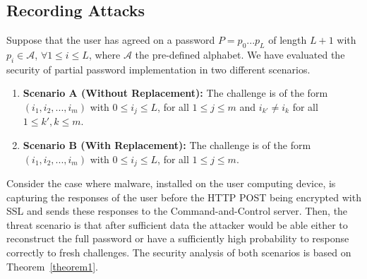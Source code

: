\documentclass{llncs}
\begin{document}
\subsection{Recording Attacks} \label{sec21}


Suppose that the user has agreed on a password
$P=p_0...p_L$ of length $L+1$ with $p_i \in \mathcal{A}$, $\forall 1 \leq i \leq L$, where $\mathcal{A}$ the pre-defined alphabet. We have evaluated the security of partial password implementation in
two different scenarios.

\begin{enumerate}
  \item \textbf{Scenario A (Without Replacement):} The challenge is of the form \linebreak $(i_1,i_2,...,i_m)$
       with $0\leq i_j \leq L$, for all $1 \leq j \leq m$
       and $i_{k'} \neq i_k$ for all $1 \leq k',k \leq m$.
  \item \textbf{Scenario B (With Replacement):} The challenge is of the form \linebreak $(i_1,i_2,...,i_m)$
       with $0\leq i_j \leq L$, for all $1 \leq j \leq m$.
\end{enumerate}

Consider the case where malware, installed on the user computing device, is capturing the responses of the user before the
HTTP POST being encrypted with SSL and sends these responses to
the Command-and-Control server. Then, the threat scenario is
that after sufficient data the attacker would be able either
to reconstruct the full password or have a sufficiently high
probability to response correctly to fresh challenges. The security
analysis of both scenarios is based on Theorem~\ref{theorem1}.
\end{document}
